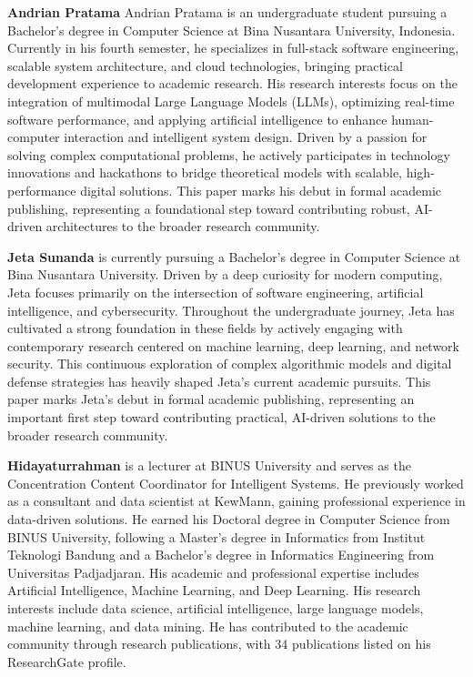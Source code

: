 \documentclass[12pt,a4paper]{article}
\begin{document}
\textbf{Andrian Pratama} Andrian Pratama is an undergraduate student pursuing a Bachelor’s degree in Computer Science at Bina Nusantara University, Indonesia. Currently in his fourth semester, he specializes in full-stack software engineering, scalable system architecture, and cloud technologies, bringing practical development experience to academic research. His research interests focus on the integration of multimodal Large Language Models (LLMs), optimizing real-time software performance, and applying artificial intelligence to enhance human-computer interaction and intelligent system design. Driven by a passion for solving complex computational problems, he actively participates in technology innovations and hackathons to bridge theoretical models with scalable, high-performance digital solutions. This paper marks his debut in formal academic publishing, representing a foundational step toward contributing robust, AI-driven architectures to the broader research community.

\textbf{Jeta Sunanda} is currently pursuing a Bachelor's degree in Computer Science at Bina Nusantara University. Driven by a deep curiosity for modern computing, Jeta focuses primarily on the intersection of software engineering, artificial intelligence, and cybersecurity. Throughout the undergraduate journey, Jeta has cultivated a strong foundation in these fields by actively engaging with contemporary research centered on machine learning, deep learning, and network security. This continuous exploration of complex algorithmic models and digital defense strategies has heavily shaped Jeta's current academic pursuits. This paper marks Jeta's debut in formal academic publishing, representing an important first step toward contributing practical, AI-driven solutions to the broader research community.

\textbf{Hidayaturrahman} is a lecturer at BINUS University and serves as the Concentration Content Coordinator for Intelligent Systems. He previously worked as a consultant and data scientist at KewMann, gaining professional experience in data-driven solutions. He earned his Doctoral degree in Computer Science from BINUS University, following a Master’s degree in Informatics from Institut Teknologi Bandung and a Bachelor’s degree in Informatics Engineering from Universitas Padjadjaran. His academic and professional expertise includes Artificial Intelligence, Machine Learning, and Deep Learning. His research interests include data science, artificial intelligence, large language models, machine learning, and data mining. He has contributed to the academic community through research publications, with 34 publications listed on his ResearchGate profile.
\end{document}

